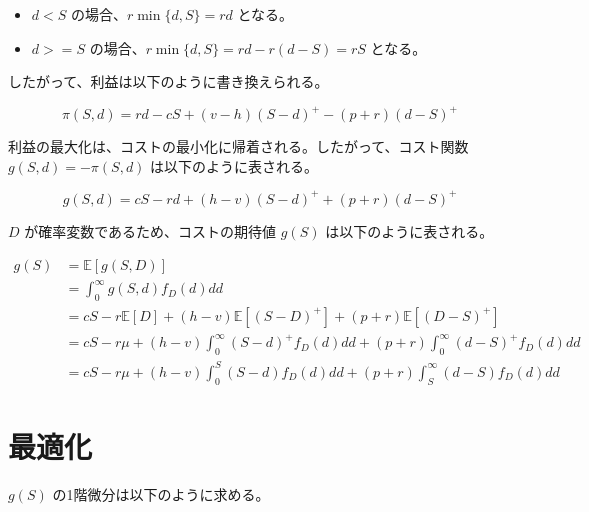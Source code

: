 \documentclass[
  japanese,
  letterpaper,
]{ltjbook}
\providecommand{\tightlist}{%
  \setlength{\itemsep}{0pt}\setlength{\parskip}{0pt}}
\theoremstyle{plain}
\theoremstyle{definition}
\theoremstyle{remark}
\begin{document}
\begin{tcolorbox}[enhanced jigsaw, colbacktitle=quarto-callout-note-color!10!white, breakable, opacitybacktitle=0.6, bottomrule=.15mm, title=\textcolor{quarto-callout-note-color}{\faInfo}\hspace{0.5em}{ノート}, leftrule=.75mm, toprule=.15mm, titlerule=0mm, colback=white, colframe=quarto-callout-note-color-frame, bottomtitle=1mm, toptitle=1mm, arc=.35mm, rightrule=.15mm, opacityback=0, left=2mm, coltitle=black]

\begin{itemize}
\tightlist
\item
  \(d < S\) の場合、\(r \min\{d, S\} = r d\) となる。
\item
  \(d >= S\) の場合、\(r \min\{d, S\} = r d - r(d - S) = r S\) となる。
\end{itemize}

\end{tcolorbox}

したがって、利益は以下のように書き換えられる。

\[
\pi(S, d) = r d - cS + (v- h) (S - d)^+ - (p + r) (d - S)^+
\]

利益の最大化は、コストの最小化に帰着される。したがって、コスト関数
\(g(S, d) = -\pi(S, d)\) は以下のように表される。

\[
g(S, d) = cS - rd + (h - v) (S - d)^+ + (p + r) (d - S)^+
\]

\(D\) が確率変数であるため、コストの期待値 \(g(S)\)
は以下のように表される。

\begin{align}
g(S) &= \mathbb{E}[g(S, D)] \\
&= \int_{0}^{\infty} g(S, d) f_D(d) dd \\
&= cS - r\mathbb{E}[D] + (h - v) \mathbb{E}[(S - D)^+] + (p + r) \mathbb{E}[(D - S)^+] \\
&= c S - r \mu + (h - v)  \int_{0}^{\infty}(S - d)^+ f_D(d) dd + (p + r) \int_{0}^{\infty} (d - S)^+ f_D(d) dd \\
&= c S - r \mu + (h - v) \int_{0}^{S} (S - d) f_D(d) dd + (p + r) \int_{S}^{\infty} (d - S) f_D(d) dd
\end{align}

\section{最適化}\label{ux6700ux9069ux5316}

\(g(S)\) の1階微分は以下のように求める。
\end{document}
